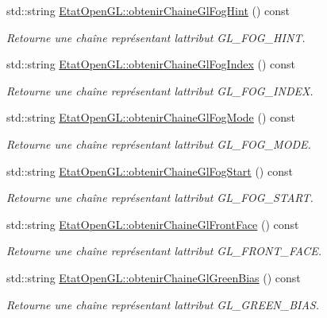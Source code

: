 \begin{DoxyCompactItemize}
std\+::string \hyperlink{group__utilitaire_ga8bd30ecaffe9f7d38e7a447a185dc8d0}{Etat\+Open\+G\+L\+::obtenir\+Chaine\+Gl\+Fog\+Hint} () const 
\begin{DoxyCompactList}\small\item\em Retourne une chaîne représentant l\textquotesingle{}attribut G\+L\+\_\+\+F\+O\+G\+\_\+\+H\+I\+N\+T. \end{DoxyCompactList}\item 
std\+::string \hyperlink{group__utilitaire_ga929e0d580e014af6abda36f16fce43c3}{Etat\+Open\+G\+L\+::obtenir\+Chaine\+Gl\+Fog\+Index} () const 
\begin{DoxyCompactList}\small\item\em Retourne une chaîne représentant l\textquotesingle{}attribut G\+L\+\_\+\+F\+O\+G\+\_\+\+I\+N\+D\+E\+X. \end{DoxyCompactList}\item 
std\+::string \hyperlink{group__utilitaire_ga1f28b3ec34f9bd4a2080e1252ca64d57}{Etat\+Open\+G\+L\+::obtenir\+Chaine\+Gl\+Fog\+Mode} () const 
\begin{DoxyCompactList}\small\item\em Retourne une chaîne représentant l\textquotesingle{}attribut G\+L\+\_\+\+F\+O\+G\+\_\+\+M\+O\+D\+E. \end{DoxyCompactList}\item 
std\+::string \hyperlink{group__utilitaire_ga7063764912254ec440429aee9e8c3f83}{Etat\+Open\+G\+L\+::obtenir\+Chaine\+Gl\+Fog\+Start} () const 
\begin{DoxyCompactList}\small\item\em Retourne une chaîne représentant l\textquotesingle{}attribut G\+L\+\_\+\+F\+O\+G\+\_\+\+S\+T\+A\+R\+T. \end{DoxyCompactList}\item 
std\+::string \hyperlink{group__utilitaire_ga5843f630d530a2112407e19b540e3c42}{Etat\+Open\+G\+L\+::obtenir\+Chaine\+Gl\+Front\+Face} () const 
\begin{DoxyCompactList}\small\item\em Retourne une chaîne représentant l\textquotesingle{}attribut G\+L\+\_\+\+F\+R\+O\+N\+T\+\_\+\+F\+A\+C\+E. \end{DoxyCompactList}\item 
std\+::string \hyperlink{group__utilitaire_gabb435ce9e5ba38406d8c429a5a0510ed}{Etat\+Open\+G\+L\+::obtenir\+Chaine\+Gl\+Green\+Bias} () const 
\begin{DoxyCompactList}\small\item\em Retourne une chaîne représentant l\textquotesingle{}attribut G\+L\+\_\+\+G\+R\+E\+E\+N\+\_\+\+B\+I\+A\+S. \end{DoxyCompactList}\item 

\end{DoxyCompactItemize}
